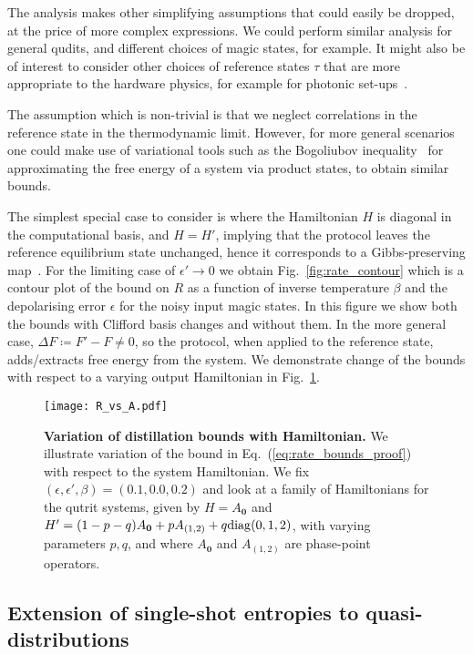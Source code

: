 \documentclass[
onecolumn,
superscriptaddress
]{revtex4-1}
\def\bmo{\boldsymbol{0}}
\begin{document}
The analysis makes other simplifying assumptions that could easily be dropped, at the price of more complex expressions. We could perform similar analysis for general qudits, and different choices of magic states, for example. It might also be of interest to consider other choices of reference states $\tau$ that are more appropriate to the hardware physics, for example for photonic set-ups~\cite{bombin2021interleaving}.

The assumption which is non-trivial is that we neglect correlations in the reference state in the thermodynamic limit. However, for more general scenarios one could make use of variational tools such as the Bogoliubov inequality~\cite{bogolyubov_1966} for approximating the free energy of a system via product states, to obtain similar bounds.

The simplest special case to consider is where the Hamiltonian $H$ is diagonal in the computational basis, and $H=H'$, implying that the protocol leaves the reference equilibrium state unchanged, hence it corresponds to a Gibbs-preserving map~\cite{faist_2015}. For the limiting case of $\epsilon' \rightarrow 0$ we obtain Fig.~\ref{fig:rate_contour} which is a contour plot of the bound on $R$ as a function of inverse temperature $\beta$ and the depolarising error $\epsilon$ for the noisy input magic states. In this figure we show both the bounds with Clifford basis changes and without them. In the more general case, $\Delta F \coloneqq F' - F \ne 0$, so the protocol, when applied to the reference state, adds/extracts free energy from the system.
We demonstrate change of the bounds with respect to a varying output Hamiltonian in Fig.~\ref{fig:rvsa}.

\begin{figure}
    \centering
    \texttt{[image: R\_vs\_A.pdf]}
    \caption{\textbf{Variation of distillation bounds with Hamiltonian.}  We illustrate variation of the bound in Eq.~(\ref{eq:rate_bounds_proof}) with respect to the system Hamiltonian. We fix $(\epsilon, \epsilon', \beta) = (0.1, 0.0, 0.2)$ and look at a family of Hamiltonians for the qutrit systems, given by $H = A_{\bmo}$ and $H' = (1-p-q)A_{\bmo}+pA_{(1,2)}+q{\rm{diag}}(0,1,2)$, with varying parameters $p, q$, and where $A_{\bmo}$ and $A_{(1,2)}$ are phase-point operators. 
    }
    \label{fig:rvsa}
\end{figure}

\subsection*{Extension of single-shot entropies to quasi-distributions}
\end{document}

